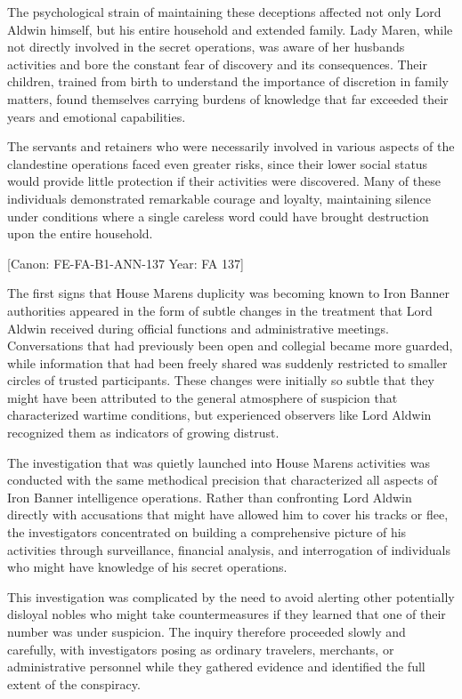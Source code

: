The psychological strain of maintaining these deceptions affected not
only Lord Aldwin himself, but his entire household and extended family.
Lady Maren, while not directly involved in the secret operations, was
aware of her husband\textquotesingle s activities and bore the constant
fear of discovery and its consequences. Their children, trained from
birth to understand the importance of discretion in family matters,
found themselves carrying burdens of knowledge that far exceeded their
years and emotional capabilities.

The servants and retainers who were necessarily involved in various
aspects of the clandestine operations faced even greater risks, since
their lower social status would provide little protection if their
activities were discovered. Many of these individuals demonstrated
remarkable courage and loyalty, maintaining silence under conditions
where a single careless word could have brought destruction upon the
entire household.

{[}Canon: FE-FA-B1-ANN-137 \textbar{} Year: FA 137{]}

The first signs that House Maren\textquotesingle s duplicity was
becoming known to Iron Banner authorities appeared in the form of subtle
changes in the treatment that Lord Aldwin received during official
functions and administrative meetings. Conversations that had previously
been open and collegial became more guarded, while information that had
been freely shared was suddenly restricted to smaller circles of trusted
participants. These changes were initially so subtle that they might
have been attributed to the general atmosphere of suspicion that
characterized wartime conditions, but experienced observers like Lord
Aldwin recognized them as indicators of growing distrust.

The investigation that was quietly launched into House
Maren\textquotesingle s activities was conducted with the same
methodical precision that characterized all aspects of Iron Banner
intelligence operations. Rather than confronting Lord Aldwin directly
with accusations that might have allowed him to cover his tracks or
flee, the investigators concentrated on building a comprehensive picture
of his activities through surveillance, financial analysis, and
interrogation of individuals who might have knowledge of his secret
operations.

This investigation was complicated by the need to avoid alerting other
potentially disloyal nobles who might take countermeasures if they
learned that one of their number was under suspicion. The inquiry
therefore proceeded slowly and carefully, with investigators posing as
ordinary travelers, merchants, or administrative personnel while they
gathered evidence and identified the full extent of the conspiracy.

